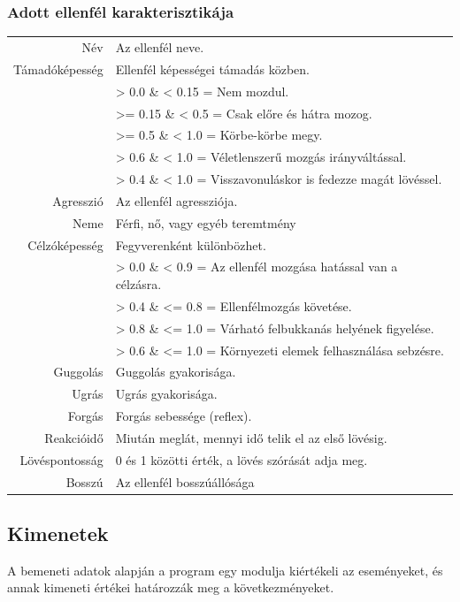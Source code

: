 \subsubsection{Adott ellenfél karakterisztikája}

\begin{tabular}{r|l}
Név & Az ellenfél neve. \\
Támadóképesség & Ellenfél képességei támadás közben.\\
&> 0.0 \& < 0.15 = Nem mozdul.\\
&>= 0.15 \& < 0.5 = Csak előre és hátra mozog.\\
&>= 0.5 \& < 1.0 = Körbe-körbe megy.\\
&> 0.6 \& < 1.0 = Véletlenszerű mozgás irányváltással.\\
&> 0.4 \& < 1.0 = Visszavonuláskor is fedezze magát lövéssel.\\
Agresszió & Az ellenfél agressziója.\\
Neme & Férfi, nő, vagy egyéb teremtmény\\
Célzóképesség & Fegyverenként különbözhet.\\
&> 0.0 \& < 0.9 = Az ellenfél mozgása hatással van a célzásra.\\
&> 0.4 \& <= 0.8 = Ellenfélmozgás követése.\\
&> 0.8 \& <= 1.0 = Várható felbukkanás helyének figyelése.\\
&> 0.6 \& <= 1.0 = Környezeti elemek felhasználása sebzésre.\\
Guggolás & Guggolás gyakorisága.\\
Ugrás & Ugrás gyakorisága.\\
Forgás & Forgás sebessége (reflex).\\
Reakcióidő & Miután meglát, mennyi idő telik el az első lövésig.\\
Lövéspontosság & 0 és 1 közötti érték, a lövés szórását adja meg.\\
Bosszú & Az ellenfél bosszúállósága\\
\end{tabular}

\subsection{Kimenetek}

A bemeneti adatok alapján a program egy modulja kiértékeli az eseményeket, és annak kimeneti értékei határozzák meg a következményeket.

